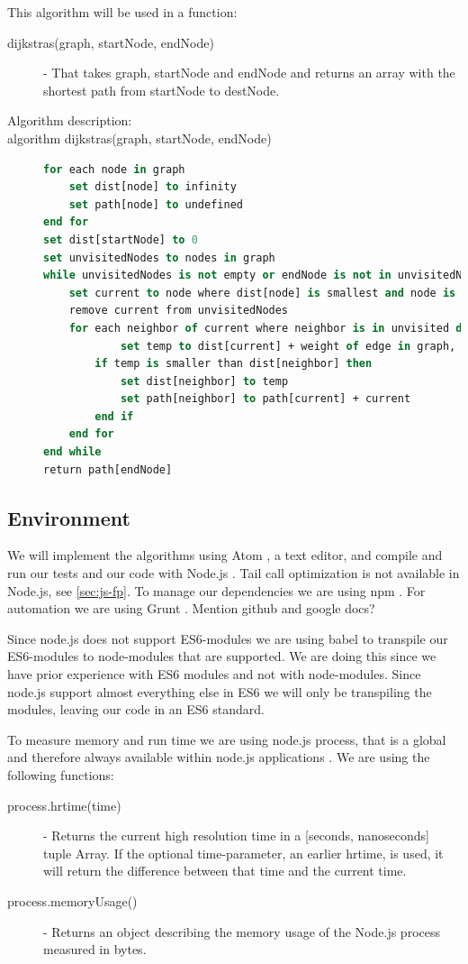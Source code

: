 \documentclass {article}
\begin{document}
This algorithm will be used in a function:
\begin{description}
\item[dijkstras(graph, startNode, endNode)] - That takes graph, startNode and endNode and returns an array with the shortest path from startNode to destNode. 

\item [Algorithm description:]
\item[algorithm dijkstras(graph, startNode, endNode)]
\item[]
\begin{lstlisting}[language=Pascal]
for each node in graph
 	set dist[node] to infinity 
 	set path[node] to undefined 
end for
set dist[startNode] to 0 
set unvisitedNodes to nodes in graph
while unvisitedNodes is not empty or endNode is not in unvisitedNodes do
 	set current to node where dist[node] is smallest and node is in unvisitedNodes
 	remove current from unvisitedNodes
  	for each neighbor of current where neighbor is in unvisited do
    		set temp to dist[current] + weight of edge in graph, where edge is from current to neighbor
 		if temp is smaller than dist[neighbor] then
 			set dist[neighbor] to temp
 			set path[neighbor] to path[current] + current
 		end if
 	end for
end while
return path[endNode]
\end{lstlisting}
\end{description}
\subsection{Environment}
We will implement the algorithms using Atom \cite{atom}, a text editor, and compile and run our tests and our code with Node.js \cite{nodejs}. Tail call optimization is not available in Node.js, see \ref{sec:js-fp}. To manage our dependencies we are using npm \cite{npm}. For automation we are using Grunt \cite{grunt}. Mention github and google docs?

Since node.js does not support ES6-modules we are using babel to transpile our ES6-modules to node-modules that are supported. We are doing this since we have prior experience with ES6 modules and not with node-modules. Since node.js support almost everything else in ES6 we will only be transpiling the modules, leaving our code in an ES6 standard.

To measure memory and run time we are using node.js process, that is a global and therefore always available within node.js applications \cite{nodejs}. We are using the following functions:
\begin{description}
\item [process.hrtime(time)] - Returns the current high resolution time in a [seconds, nanoseconds] tuple Array. If the optional time-parameter, an earlier hrtime, is used, it will return the difference between that time and the current time. 
\item [process.memoryUsage()] - Returns an object describing the memory usage of the Node.js process measured in bytes.
\end{description}
\end{document}
